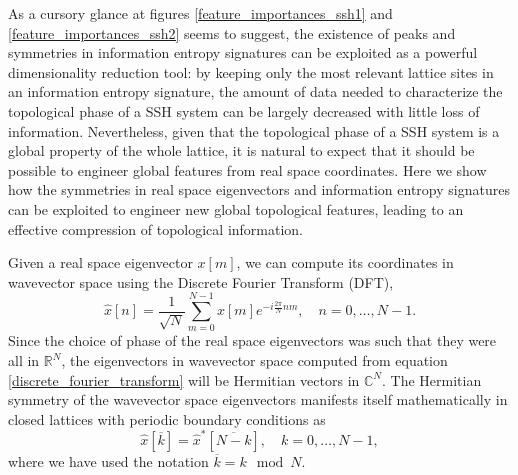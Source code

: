 \documentclass[10pt]{revtex4-1}
\begin{document}
As a cursory glance at figures \ref{feature_importances_ssh1} and \ref{feature_importances_ssh2} seems to suggest, the existence of peaks and symmetries in information entropy signatures can be exploited as a powerful dimensionality reduction tool: by keeping only the most relevant lattice sites in an information entropy signature, the amount of data needed to characterize the topological phase of a SSH system can be largely decreased with little loss of information. Nevertheless, given that the topological phase of a SSH system is a global property of the whole lattice, it is natural to expect that it should be possible to engineer global features from real space coordinates. Here we show how the symmetries in real space eigenvectors and information entropy signatures can be exploited to engineer new global topological features, leading to an effective compression of topological information.



Given a real space eigenvector $x[m]$, we can compute its coordinates in wavevector space using the Discrete Fourier Transform (DFT),  
\begin{equation}
\label{discrete_fourier_transform}
\hat{x}[n] = \frac{1}{\sqrt{N}}\sum_{m=0}^{N-1}x[m]e^{-i\frac{2\pi}{N}nm}, \quad n=0,\dots,N-1.
\end{equation}
Since the choice of phase of the real space eigenvectors was such that they were all in $\mathbb{R}^{N}$, the eigenvectors in wavevector space computed from equation \eqref{discrete_fourier_transform} will be Hermitian vectors in $\mathbb{C}^N$. The Hermitian symmetry of the wavevector space eigenvectors manifests itself mathematically in closed lattices with periodic boundary conditions as 
\begin{equation}
\label{hermitian_symmetry}
\hat{x}[\overline{k}] = \hat{x}^*[\overline{N-k}], \quad k = 0,\dots, N-1,
\end{equation}
where  we have used the notation $\overline{k} = k \mod N$. 
\end{document}
